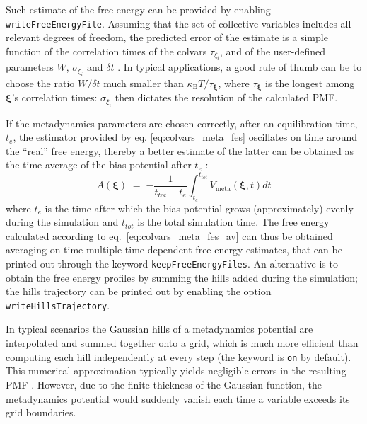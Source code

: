 Such estimate of the free energy can be provided by enabling \texttt{writeFreeEnergyFile}.
Assuming that the set of collective variables includes all relevant degrees of freedom, the predicted error of the estimate is a simple function of the correlation times of the colvars $\tau_{\xi_{i}}$, and of the user-defined parameters $W$, $\sigma_{\xi_{i}}$ and $\delta{}t$ \cite{Bussi2006}.
In typical applications, a good rule of thumb can be to choose the ratio $W/\delta{}t$ much smaller than $\kappa_{\mathrm{B}}T/\tau_{\bm{\xi}}$, where $\tau_{\bm{\xi}}$ is the longest among $\bm{\xi}$'s correlation times: $\sigma_{\xi_{i}}$ then dictates the resolution of the calculated PMF.

If the metadynamics parameters are chosen correctly, after an equilibration time, $t_{e}$, the estimator provided
by eq. \ref{eq:colvars_meta_fes} oscillates on time around the ``real'' free energy, thereby a better estimate of the latter can be obtained as the time average of the bias potential after $t_{e}$ \cite{Marinelli2009,Crespo2010}:
\begin{equation}
  \label{eq:colvars_meta_fes_av}
  A\left(\bm{\xi}\right) \; = \; {-\frac{1}{t_{tot}-t_{e}} \int_{t_{e}}^{t_{tot}} {
    V_{\mathrm{meta}}(\bm{\xi},t)dt}
  }
\end{equation}
where $t_{e}$ is the time after which the bias potential grows (approximately) evenly during the simulation and $t_{tot}$ is the total simulation time. The free energy calculated according to eq.~\ref{eq:colvars_meta_fes_av} can thus be obtained averaging on time multiple time-dependent free energy estimates, that can be printed out through the keyword \texttt{keepFreeEnergyFiles}. An alternative is to obtain the free energy profiles by summing the hills added during the simulation; the hills trajectory can be printed out by enabling the option \texttt{writeHillsTrajectory}.



In typical scenarios the Gaussian hills of a metadynamics potential are interpolated and summed together onto a grid, which is much more efficient than computing each hill independently at every step (the keyword  is \texttt{on} by default).
This numerical approximation typically yields negligible errors in the resulting PMF \cite{Fiorin2013}.
However, due to the finite thickness of the Gaussian function, the metadynamics potential would suddenly vanish each time a variable exceeds its grid boundaries.

